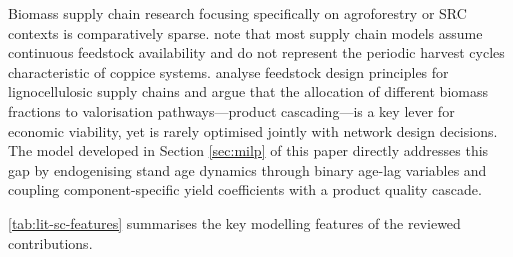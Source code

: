 \documentclass[preprint,review,1p,authoryear]{elsarticle} %
\begin{document}
Biomass supply chain research focusing specifically on agroforestry or
SRC contexts is comparatively sparse.
\citet{Espinoza2017_Biorefinery_SC_review} note that most supply chain models
assume continuous feedstock availability and do not represent the
periodic harvest cycles characteristic of coppice systems.
\citet{Lamers2015_Feedstock_Design} analyse feedstock design principles for
lignocellulosic supply chains and argue that the allocation of different
biomass fractions to valorisation pathways---product cascading---is a key
lever for economic viability, yet is rarely optimised jointly with
network design decisions. The model developed in
Section \ref{sec:milp} of this paper directly addresses this gap by
endogenising stand age dynamics through binary age-lag variables and
coupling component-specific yield coefficients with a product quality
cascade.

\autoref{tab:lit-sc-features} summarises the key modelling features
of the reviewed contributions.
\end{document}
